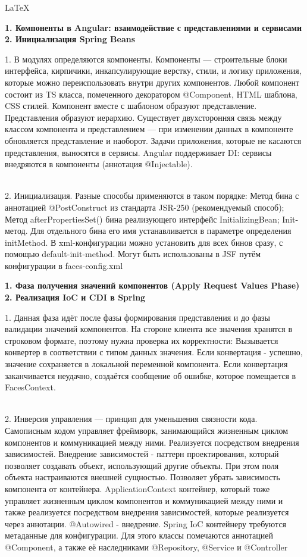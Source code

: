 \documentclass{article}
\newcommand{\bil}[4]{%
    \begin{minipage}{.3\textwidth}
        \textbf{1. #1} \\
        \textbf{2. #2}

        1. #3
        \\
        2. #4
    \end{minipage}
}
\begin{document}
\begin{center}
    \LaTeX
\end{center}
\tiny
\bil{Компоненты в Angular: взаимодействие с представлениями и сервисами}{Инициализация Spring Beans}{
    В модулях определяются компоненты. Компоненты — строительные блоки интерфейса, кирпичики, инкапсулирующие верстку, стили, и логику приложения, которые можно переиспользовать внутри других компонентов. 
    Любой компонент состоит из TS класса, помеченного декоратором @Component, HTML шаблона, CSS стилей. 
    Компонент вместе с шаблоном образуют представление. Представления образуют иерархию. 
    Существует двухсторонняя связь между классом компонента и представлением — при изменении данных в компоненте обновляется представление и наоборот.
    Задачи приложения, которые не касаются представления, выносятся в сервисы.
    Angular поддерживает DI: сервисы внедряются в компоненты (аннотация @Injectable).
}{
    Инициализация. Разные способы применяются в таком порядке: Метод бина с аннотацией @PostConstruct из стандарта JSR-250 (рекомендуемый способ); Метод afterPropertiesSet() бина реализующего интерфейс InitializingBean;
    Init-метод. Для отдельного бина его имя устанавливается в параметре определения initMethod. В xml-конфигурации можно установить для всех бинов сразу, с помощью default-init-method.
    Могут быть использованы в JSF путём конфигурации в faces-config.xml
}
\hfill
\bil{Фаза получения значений компонентов (Apply Request Values Phase)}{Реализация IoC и CDI в Spring}{
    Данная фаза идёт после фазы формирования представления и до фазы валидации значений компонентов.
    На стороне клиента все значения хранятся в строковом формате, поэтому нужна проверка их корректности: 
    Вызывается конвертер в соответствии с типом данных значения.
    Если конвертация - успешно, значение сохраняется в локальной переменной компонента.
    Если конвертация заканчивается неудачно, создаётся сообщение об ошибке, которое помещается в FacesContext.
}{
    Инверсия управления — принцип для уменьшения связности кода. Самописным кодом управляет фреймворк, занимающийся жизненным циклом компонентов и коммуникацией между ними. Реализуется посредством внедрения зависимостей.
    Внедрение зависимостей - паттерн проектирования, который позволяет создавать объект, использующий другие объекты. При этом поля объекта настраиваются внешней сущностью. 
    Позволяет убрать зависимость компонента от контейнера.
    ApplicationContext контейнер, который тоже управляет жизненным циклом компонентов и коммуникацией между ними и также реализуется посредством внедрения зависимостей, которые реализуется через аннотации.
    @Autowired - внедрение. Spring IoC контейнеру требуются метаданные для конфигурации. Для этого классы помечаются аннотацией @Component, а также её наследниками @Repository, @Service и @Controller
}
\end{document}
